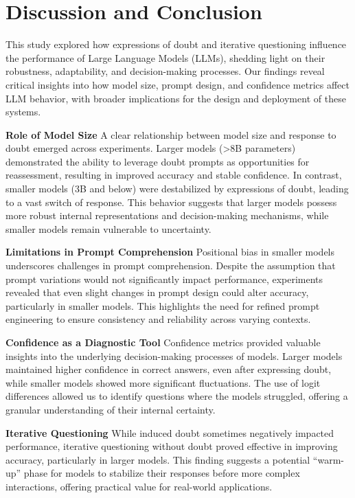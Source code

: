 \section{Discussion and Conclusion}

This study explored how expressions of doubt and iterative questioning influence the performance of Large Language Models (LLMs), shedding light on their robustness, adaptability, and decision-making processes. Our findings reveal critical insights into how model size, prompt design, and confidence metrics affect LLM behavior, with broader implications for the design and deployment of these systems.

\textbf{Role of Model Size} 
A clear relationship between model size and response to doubt emerged across experiments. Larger models (>8B parameters) demonstrated the ability to leverage doubt prompts as opportunities for reassessment, resulting in improved accuracy and stable confidence. In contrast, smaller models (3B and below) were destabilized by expressions of doubt, leading to a vast switch of response. This behavior suggests that larger models possess more robust internal representations and decision-making mechanisms, while smaller models remain vulnerable to uncertainty.

\textbf{Limitations in Prompt Comprehension} 
Positional bias in smaller models underscores challenges in prompt comprehension. Despite the assumption that prompt variations would not significantly impact performance, experiments revealed that even slight changes in prompt design could alter accuracy, particularly in smaller models. This highlights the need for refined prompt engineering to ensure consistency and reliability across varying contexts.

\textbf{Confidence as a Diagnostic Tool}
Confidence metrics provided valuable insights into the underlying decision-making processes of models. Larger models maintained higher confidence in correct answers, even after expressing doubt, while smaller models showed more significant fluctuations. The use of logit differences allowed us to identify questions where the models struggled, offering a granular understanding of their internal certainty.

\textbf{Iterative Questioning}
While induced doubt sometimes negatively impacted performance, iterative questioning without doubt proved effective in improving accuracy, particularly in larger models. This finding suggests a potential ``warm-up'' phase for models to stabilize their responses before more complex interactions, offering practical value for real-world applications.

